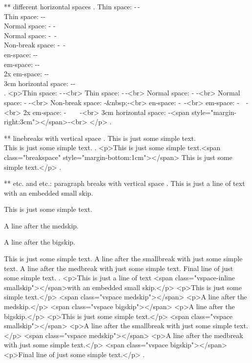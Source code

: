 ** different horizontal spaces
.
Thin space: -\,- \\
Thin space: -\thinspace- \\
Normal space: - - \\
Normal space: -\ - \\
Non-break space: -~- \\
en-space: -\enspace- \\
em-space: -\quad- \\
2x em-space: -\qquad-\\
3cm horizontal space: -\hspace{3cm}- \\
.
<p>Thin space: ‐ ‐<br>
Thin space: ‐ ‐<br>
Normal space: ‐ ‐<br>
Normal space: ‐​ ‐<br>
Non‐break space: ‐&nbsp;‐<br>
en‐space: ‐ ‐<br>
em‐space: ‐ ‐<br>
2x em‐space: ‐  ‐<br>
3cm horizontal space: ‐<span style="margin-right:3cm"></span>‐<br>
</p>
.


** linebreaks with vertical space
.
This is just some simple text.\\[1cm]
This is just some simple text.
.
<p>This is just some simple text.<span class="breakspace" style="margin-bottom:1cm"></span>
This is just some simple text.</p>
.


** \smallskip etc. and \smallbreak etc.: paragraph breaks with vertical space
.
This is just a line of text \smallskip with an embedded small skip.

This is just some simple text.

\medskip
A line after the medskip.

\bigskip

A line after the bigskip.

This is just some simple text.
\smallbreak
A line after the smallbreak with just some simple text.
\medbreak
A line after the medbreak with just some simple text.
\bigbreak
Final line of just some simple text.
.
<p>This is just a line of text <span class="vspace-inline smallskip"></span>with an embedded small skip.</p>
<p>This is just some simple text.</p>
<span class="vspace medskip"></span>
<p>A line after the medskip.</p>
<span class="vspace bigskip"></span>
<p>A line after the bigskip.</p>
<p>This is just some simple text.</p>
<span class="vspace smallskip"></span>
<p>A line after the smallbreak with just some simple text.</p>
<span class="vspace medskip"></span>
<p>A line after the medbreak with just some simple text.</p>
<span class="vspace bigskip"></span>
<p>Final line of just some simple text.</p>
.
